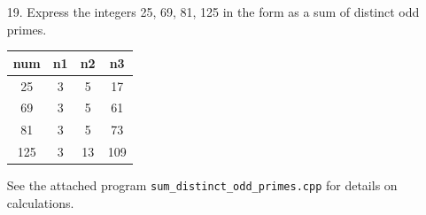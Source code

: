 \documentclass[10pt,oneside]{book}
\newcommand{\gspc}{\vspace{0.13cm}} %
\newcommand{\gline}{\gspc\\} %
\let\endoldproof\endproof
\renewenvironment{proof}[1][\proofname]
  {\vspace{0.2cm}\begin{adjustwidth}{2em}{2em}
   \oldproof[#1]}
  {\endoldproof
\end{adjustwidth}}
\begin{document}
\begin{enumerate}
\begin{adjustwidth}{2em}{2em}
\begin{align*}
			(6n+5)\cdot(6n+5) &= 36n^2 + 60n + 25\\
			&= 6(6n^2 + 10n+4)+ 1
		\end{align*}
	\end{adjustwidth}
	\begin{adjustwidth}{2em}{2em}
		\textit{Lemma 13.2} The multiplication of two integers of the form $6n+1$ results in an integer of the form $6n+1$:
		\begin{align*}
			(6n+1)\cdot(6n+1) &= 36n^2 + 12n + 1\\
			&= 6(6n^2 + 2n)+ 1
		\end{align*}
	\end{adjustwidth}
	\begin{proof}
		\textit{By Contradiction. }We want to show that there are infinitely many primes of theform $6n +5$. For the sake of contradiction, let $N$ be a composite integer of the form $6n + 5$ given by:
		\begin{align*}
			N &= 6q_1q_2\cdots q_s - 1\\
			&= 6(q_1q_2\cdots q_s - 1) + 5,
		\end{align*}
		where $q_1q_2\cdots q_3$ contains the finite number of primes of the form $6n +5$. Let $r_1r_2\cdots r_s$ be the prime factorization of $N$. Because $N$ is odd, we know that each prime is either of the form $6n+1$ or $6n +5$ (and not $6n+3$ because $6n+3$ is trivially not prime).\gline
		Via Lemmas 13.1 and 13.2, we know that $N$ must contain at least one prime factor of the form $6n+5$. Let $r_i$ be one of these primes. This must mean that:
		\begin{gather*}
			r_i\in\{q_1,\ldots, q_s\},\;\;r\mid (q_1\cdots q_s)\\
			r_i\mid N.
		\end{gather*}
		Thus, if $r_i\mid N$ and $r_i\mid (q_1\cdots q_s)$, then $r_i\mid (q_1\cdots q_s) - N$. Because $(q_1\cdots q_s) - N = 1$, we then have that $r\mid 1$, a contradiction, because no prime divides 1.\gline
		Hence, there must be an infinite number of primes of the form $6n+5$, as desired. 
	\end{proof}
	\item [19.] Express the integers 25, 69, 81, 125 in the form as a sum of distinct odd primes.
	\begin{center}
		\begin{tabular}{|c|c|c|c|}\hline 
			num & n1 & n2 & n3\\\hline
			25& 3& 5& 17\\\hline
			69& 3& 5& 61\\\hline
			81& 3& 5& 73\\\hline
			125& 3& 13& 109\\\hline
		\end{tabular}
	\end{center}
	See the attached program \texttt{sum\_distinct\_odd\_primes.cpp} for details on calculations.
	
\end{enumerate}
\end{document}
